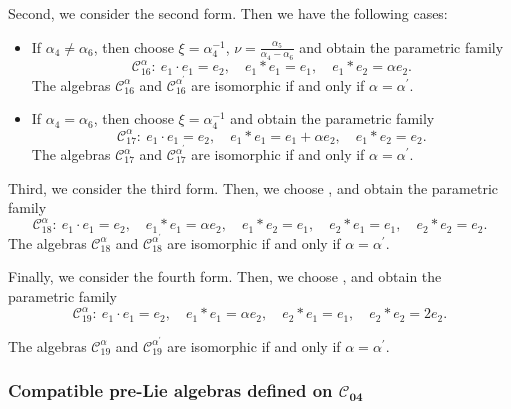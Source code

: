 \documentclass[10pt,a4paper]{amsart}
\numberwithin{equation}{section}
\begin{document}
Second, we consider the second form. Then we have the following cases:
\begin{itemize}\itemsep=0pt
\item If $\alpha _{4}\neq\alpha _{6}$, then choose $\xi ={\alpha^{-1}
_{4}}$, $\nu =\frac{\alpha _{5}}{\alpha _{4}-\alpha _{6}}$
and obtain the parametric family
\[
\mathcal{C}_{16}^{\alpha }\colon \
e_{1}\cdot e_{1}=e_{2}, \quad
e_{1}\ast e_{1}=e_{1},\quad e_{1}\ast e_{2}=\alpha e_{2}.
\]
The algebras $\mathcal{C}_{16}^{\alpha }$ and $\mathcal{C}_{16}^{\alpha ^{\prime
}} $ are isomorphic if and only if $\alpha =\alpha ^{\prime }$.

\item If $\alpha _{4}=\alpha _{6}$, then choose $\xi ={\alpha^{-1} _{4}}$
and obtain the parametric family
\[
\mathcal{C}_{17}^{\alpha }\colon \
e_{1}\cdot e_{1}=e_{2}, \quad
e_{1}\ast e_{1}=e_{1}+\alpha e_{2},\quad e_{1}\ast e_{2}=e_{2}.
\]
The algebras $\mathcal{C}_{17}^{\alpha }$ and $\mathcal{C}_{17}^{\alpha ^{\prime}} $ are isomorphic if and only if $\alpha =\alpha ^{\prime }$.
\end{itemize}

Third, we consider the third form. Then, we choose ,  and
obtain the parametric family
\[
\mathcal{C}_{18}^{\alpha }\colon \
e_{1}\cdot e_{1}=e_{2}, \quad
e_{1}\ast e_{1}=\alpha e_{2},\quad e_{1}\ast e_{2}=e_{1},\quad e_{2}\ast
e_{1}=e_{1},\quad e_{2}\ast e_{2}=e_{2}.
\]
The algebras $\mathcal{C}_{18}^{\alpha }$ and $\mathcal{C}_{18}^{\alpha ^{\prime}} $ are isomorphic if and only if $\alpha =\alpha ^{\prime }$.

Finally, we consider the fourth form. Then, we choose \smash{$\xi =
\alpha^{-\frac 12} _{12}$}, \smash{$\nu =-{\alpha _{10}}{\alpha _{12}^{-\frac{3}{2}}}$} and
obtain the parametric family
\[
\mathcal{C}_{19}^{\alpha }\colon \
e_{1}\cdot e_{1}=e_{2}, \quad
e_{1}\ast e_{1}=\alpha e_{2},\quad e_{2}\ast e_{1}=e_{1},\quad e_{2}\ast
e_{2}=2e_{2}.
\]

The algebras $\mathcal{C}_{19}^{\alpha }$ and $\mathcal{C}_{19}^{\alpha ^{\prime
}} $ are isomorphic if and only if $\alpha =\alpha ^{\prime }$.

\subsubsection[Compatible pre-Lie algebras defined on C\_\{04\}]{Compatible pre-Lie algebras defined on $\boldsymbol{\mathcal{C}_{04}}$}
\end{document}
